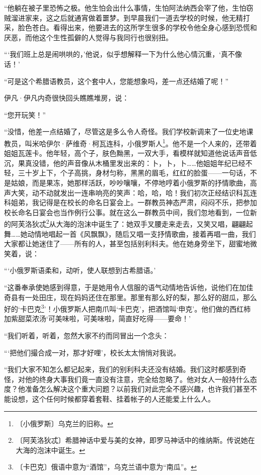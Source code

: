 \documentclass[12pt,UTF-8,openany]{ctexbook}
\begin{document}
\begin{large}
    “他躺在被子里恐怖之极。他生怕会出什么事情，生怕阿法纳西会宰了他，生怕窃贼溜进家来，这之后就通宵做着噩梦。到早晨我们一道去学校的时候，他无精打采，脸色苍白。看得出来，他要进去的这所学生很多的学校令他全身心感到恐慌和厌恶，而他这个生性孤僻的人觉得与我同行也很别扭。
    
    “‘我们班上总是闹哄哄的，’他说，似乎想解释一下为什么他心情沉重，‘真不像话！’
    
    “可是这个希腊语教员，这个套中人，您能想象吗，差一点还结婚了呢！”
    
    伊凡·伊凡内奇很快回头瞧瞧堆房，说：
    
    “您开玩笑！”
    
    “没惜，他差一点结婚了，尽管这是多么令人奇怪。我们学校新调来了一位史地课教员，叫米哈伊尔·萨维奇·柯瓦连科，小俄罗斯人\footnote{〔小俄罗斯〕乌克兰的旧称。}。他不是一个人来的，还带着姐姐瓦莲卡。他年轻，高个子，肤色黝黑，一双大手，看模样就知道他说话声音低沉，果真没错，他的声音像从木桶里发出来的：卜，卜，卜……他姐姐年纪已经不轻，三十岁上下，个子高挑，身材匀称，黑黑的眉毛，红红的脸蛋——一句话，不是姑娘，而是果冻，她那样活跃，吵吵嚷嚷，不停地哼着小俄罗斯的抒情歌曲，高声大笑，动不动就发出一连串响亮的笑声：哈，哈，哈！我们初次正经结识科瓦连科姐弟，我记得是在校长的命名日宴会上。一群教员神态严肃，闷闷不乐，把参加校长命名日宴会也当作例行公事。就在这么一群教员中间，我们忽地看到，一位新的阿芙洛狄忒\footnote{〔阿芙洛狄忒〕希腊神话中爱与美的女神，即罗马神话中的维纳斯。传说她在大海的泡沫中诞生。}从大海的泡沫中诞生了：她双手叉腰走来走去，又笑又唱，翩翩起舞……她动情地唱起一首《风飘飘》，随后又唱一支抒情歌曲，接着再唱一曲，我们大家都让她迷住了——所有的人，甚至包括别利科夫。他在她身旁坐下，甜蜜地微笑着，说：
    
    “‘小俄罗斯语柔和，动听，使人联想到古希腊语。’
    
    “这番奉承使她感到得意，于是她用令人信服的语气动情地告诉他，说他们在加佳奇县有一处田庄，现在妈妈还住在那里。那里有那么好的梨，那么好的甜瓜，那么好的‘卡巴克\footnote{〔卡巴克〕俄语中意为“酒馆”，乌克兰语中意为“南瓜”。}’！小俄罗斯人把南爪叫‘卡巴克’，把酒馆叫‘申克’。他们做的西红柿加紫甜菜浓汤‘可美味啦，可美味啦，简直好吃得——要命！’
    
    “我们听着，听着，忽然大家不约而同冒出一个念头：
    
    “‘把他们撮合成一对，那才好哩’，校长太太悄悄对我说。
    
    “我们大家不知怎么都记起来，我们的别利科夫还没有结婚。我们这时都感到奇怪，对他的终身大事我们竟一直没有注意，完全给忽略了。他对女人一般持什么态度？他准备怎么解决这个重大问题？以前我们对此完全不感兴趣，也许我们甚至不能设想，这个任何时候都穿着套鞋、挂着帐子的人还能爱上什么人。
    

\end{large}
\end{document}
